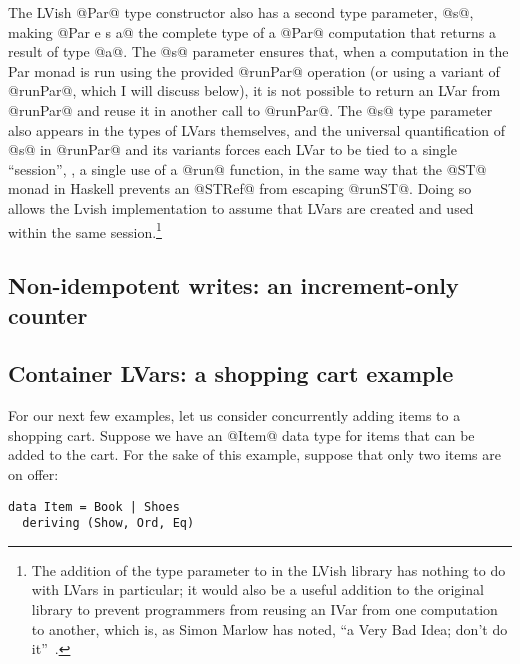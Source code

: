 The LVish @Par@ type constructor also has a second type parameter,
@s@, making @Par e s a@ the complete type of a @Par@ computation that
returns a result of type @a@.  The @s@ parameter ensures that, when a
computation in the Par monad is run using the provided @runPar@
operation (or using a variant of @runPar@, which I will discuss
below), it is not possible to return an LVar from @runPar@ and reuse
it in another call to @runPar@.  The @s@ type parameter also appears
in the types of LVars themselves, and the universal quantification of
@s@ in @runPar@ and its variants forces each LVar to be tied to a
single ``session'', \ie, a single use of a @run@ function, in the same
way that the @ST@ monad in Haskell prevents an @STRef@ from escaping
@runST@.  Doing so allows the Lvish implementation to assume that
LVars are created and used within the same session.\footnote{The
  addition of the  type parameter to  in the LVish
  library has nothing to do with LVars in particular; it would also be
  a useful addition to the original  library to prevent
  programmers from reusing an IVar from one  computation to
  another, which is, as Simon Marlow has noted, ``a Very Bad Idea;
  don't do it''~\cite{marlow-book}.}

\subsection{Non-idempotent writes: an increment-only counter}


\subsection{Container LVars: a shopping cart example}\label{subsection:lvish-container-lvars}

For our next few examples, let us consider concurrently adding items
to a shopping cart.  Suppose we have an @Item@ data type for items
that can be added to the cart.  For the sake of this example, suppose
that only two items are on offer:

\singlespacing
\begin{lstlisting}
data Item = Book | Shoes
  deriving (Show, Ord, Eq)
\end{lstlisting}
\doublespacing

